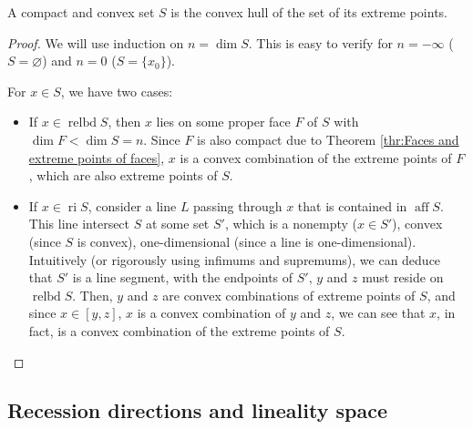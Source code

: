 \begin{theorem}
\label{thr:Krein-Milman Theorem}
  A compact and convex set \( S \) is the convex hull of the set of its extreme
  points.
\end{theorem}

\begin{proof}
  We will use induction on \( n = \dim S \). This is easy to
  verify for \( n = -\infty \) (\( S = \varnothing \)) and \( n = 0 \) (\( S =
  \{x_{0}\}   \)).

  For \( x \in S \), we have two cases:

  \begin{itemize}
  \item If \( x \in \operatorname{relbd} S \), then \( x \) lies on some proper
    face \( F \) of \( S \) with \( \dim F < \operatorname{dim} S
    = n\). Since \( F \) is also compact due to Theorem \ref{thr:Faces and
    extreme points of faces}, \( x \) is a convex combination of the
    extreme points of \( F \), which are also extreme points of \( S \).

  \item If \( x \in \operatorname{ri} S \), consider a line \( L \) passing
    through \( x \) that is contained in \( \operatorname{aff} S \). This line
    intersect \( S \) at some set \( S' \), which is a nonempty (\( x \in S'
    \)), convex (since \( S \) is convex), one-dimensional (since a line is
    one-dimensional). Intuitively (or rigorously using infimums and supremums),
    we can deduce that \( S' \) is a line segment, with the endpoints of \( S'
    \), \( y \) and \( z \) must reside on \( \operatorname{relbd} S \). Then,
    \( y \) and \( z \) are convex combinations of extreme points of \( S \),
    and since \( x \in [y, z] \), \( x \) is a convex combination of \( y \) and
    \( z \), we can see that \( x \), in fact, is a convex combination of the
    extreme points of \( S \).
  \end{itemize}
\end{proof}


\subsection{Recession directions and lineality space} %
\label{sub:Recession directions and lineality space}

